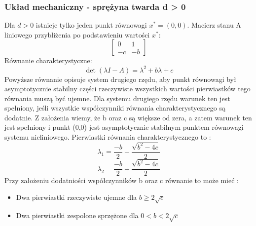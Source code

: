 \documentclass[a4paper,11pt]{article}
\begin{document}
\subsubsection{Układ mechaniczny - sprężyna twarda d > 0}
Dla \(d>0\) istnieje tylko jeden punkt równowagi \(x^{*}=(0,0)\). Macierz stanu A liniowego przybliżenia po podstawieniu wartości  \(x^{*}\):
\begin{equation*}
\begin{bmatrix}
0 & 1 \\
-c & -b 
\end{bmatrix}
\end{equation*}
Równanie charakterystyczne: 
\begin{equation*}
\det{(\lambda I-A)}=\lambda^{2}+b\lambda+c
\end{equation*}
Powyższe równanie opisuje system drugiego rzędu, aby punkt równowagi był asymptotycznie stabilny części rzeczywiste wszystkich wartości pierwiastków tego równania muszą być ujemne. Dla systemu drugiego rzędu warunek ten jest spełniony, jeśli wszystkie współczynniki równania charakterystycznego są dodatnie. Z założenia wiemy, że b oraz c są większe od zera, a zatem warunek ten jest spełniony i punkt (0,0) jest asymptotycznie stabilnym punktem równowagi systemu nieliniowego.
Pierwiastki równania charakterystycznego to : 
\begin{equation*}
\lambda_{1}=\frac{-b}{2}-\frac{\sqrt{b^{2}-4c}}{2}
\end{equation*}
\begin{equation*}
\lambda_{2}=\frac{-b}{2}+\frac{\sqrt{b^{2}-4c}}{2}
\end{equation*}
Przy założeniu dodatniości współczynników b oraz c równanie to może mieć :\\
\begin{itemize}
\item Dwa pierwiastki rzeczywiste ujemne dla \(b\geqslant2\sqrt{c}\)
\item Dwa pierwiastki zespolone sprzężone dla \(0<b<2\sqrt{c}\)
\end{itemize}
\end{document}

